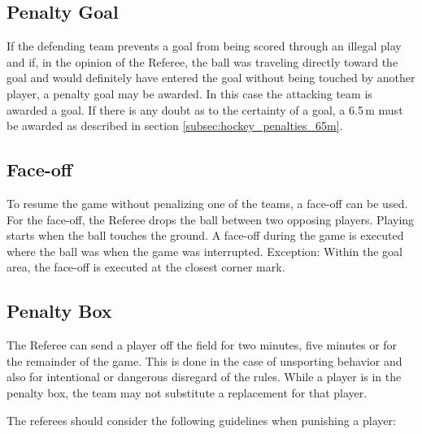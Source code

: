 \subsection{Penalty Goal}
If the defending team prevents a goal from being scored through an illegal play and if, in the opinion of the Referee, the ball was traveling directly toward the goal and would definitely have entered the goal without being touched by another player, a penalty goal may be awarded.
In this case the attacking team is awarded a goal.
If there is any doubt as to the certainty of a goal, a 6.5\,m must be awarded as described in section \ref{subsec:hockey_penalties_65m}.

\subsection{Face-off \label{subsec:hockey_penalties_face-off}}
To resume the game without penalizing one of the teams, a face-off can be used.
For the face-off, the Referee drops the ball between two opposing players.
Playing starts when the ball touches the ground.
A face-off during the game is executed where the ball was when the game was interrupted.
Exception: Within the goal area, the face-off is executed at the closest corner mark.

\subsection{Penalty Box}
The Referee can send a player off the field for two minutes, five minutes or for the remainder of the game.
This is done in the case of unsporting behavior and also for intentional or dangerous disregard of the rules.
While a player is in the penalty box, the team may not substitute a replacement for that player.

The referees should consider the following guidelines when punishing a player:

